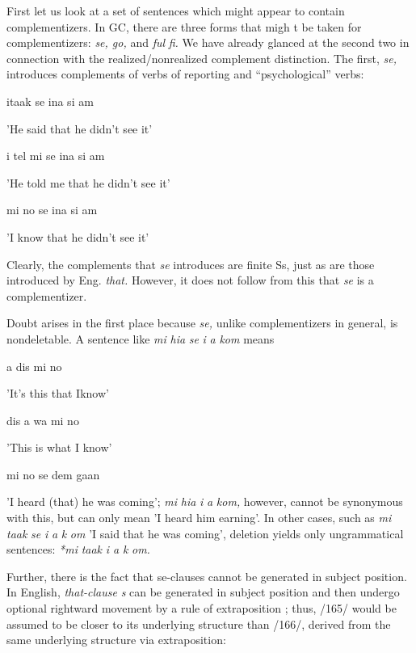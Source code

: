 First let us look at a set of sentences which might appear to contain complementizers. In GC, there are three forms that migh t be taken for complementizers: \textit{se, go,} and \textit{ful} \textit{fi.} We have already glanced at the second two in connection with the realized/nonrealized com\-plement distinction. The first, \textit{se,} introduces complements of verbs of reporting and ``psychological'' verbs:

\ea\label{ex:162}
 itaak se ina si am
\glt
\z

'He said that he didn't see it'

\ea\label{ex:163}
 i tel mi se ina si am
\glt
\z

'He told me that he didn't see it'

\ea\label{ex:164}
 mi no se ina si am
\glt
\z

'I know that he didn't see it'


Clearly, the complements that \textit{se} introduces are finite Ss, just as are those introduced by Eng. \textit{that.} However, it does not follow from this that \textit{se} is a complementizer.

Doubt arises in the first place because \textit{se,} unlike complementizers in general, is nondeletable. A sentence like \textit{mi} \textit{hia} \textit{se} \textit{i} \textit{a} \textit{kom} means

\ea\label{ex:170}
 a dis mi no
\glt
\z

'It's this that Iknow'

\ea\label{ex:171}
 dis a wa mi no
\glt
\z

'This is what I know'

\ea\label{ex:172}
 mi no se dem gaan
\glt
\z


'I heard (that) he was coming'; \textit{mi} \textit{hia} \textit{i} \textit{a} \textit{k}\textit{om,} however, cannot be synonymous with this, but can only mean 'I heard him earning'. In other cases, such as \textit{mi} \textit{taak} \textit{se} \textit{i} \textit{a} \textit{k} \textit{om} 'I said that he was coming', deletion yields only ungrammatical sentences: \textit{*mi} \textit{taak} \textit{i a} \textit{k} \textit{om.}

Further, there is the fact that se-clauses cannot be generated in subject position. In English, \textit{that-clause} \textit{s} can be generated in subject position and then undergo optional rightward movement by a rule of extraposition ; thus, /165/ would be assumed to be closer to its underlying structure than /166/, derived from the same underlying structure via extraposition:

